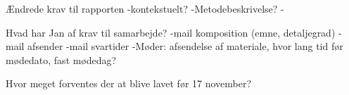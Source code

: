 Ændrede krav til rapporten
-kontekstuelt?
-Metodebeskrivelse?
-


Hvad har Jan af krav til samarbejde?
-mail komposition (emne, detaljegrad)
-mail afsender
-mail svartider
-Møder: afsendelse af materiale, hvor lang tid før mødedato, fast mødedag?

Hvor meget forventes der at blive lavet før 17 november?

